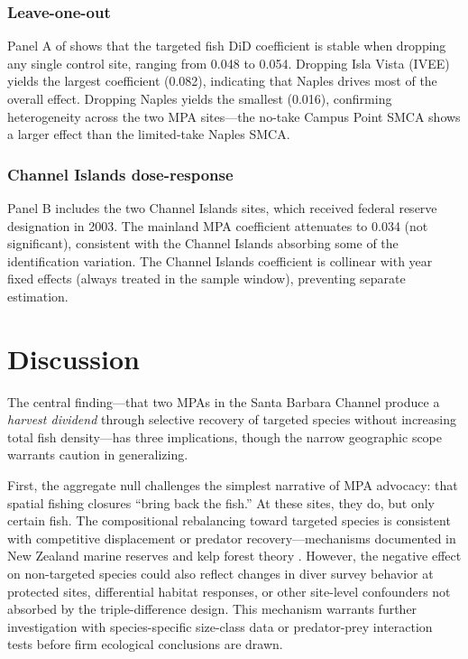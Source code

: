 \documentclass[12pt]{article}
\begin{document}


\subsubsection*{Leave-one-out} Panel A of  shows that the targeted fish DiD coefficient is stable when dropping any single control site, ranging from 0.048 to 0.054. Dropping Isla Vista (IVEE) yields the largest coefficient (0.082), indicating that Naples drives most of the overall effect. Dropping Naples yields the smallest (0.016), confirming heterogeneity across the two MPA sites---the no-take Campus Point SMCA shows a larger effect than the limited-take Naples SMCA.

\subsubsection*{Channel Islands dose-response} Panel B includes the two Channel Islands sites, which received federal reserve designation in 2003. The mainland MPA coefficient attenuates to 0.034 (not significant), consistent with the Channel Islands absorbing some of the identification variation. The Channel Islands coefficient is collinear with year fixed effects (always treated in the sample window), preventing separate estimation.


\section{Discussion}
\label{sec:discussion}

The central finding---that two MPAs in the Santa Barbara Channel produce a \textit{harvest dividend} through selective recovery of targeted species without increasing total fish density---has three implications, though the narrow geographic scope warrants caution in generalizing.

First, the aggregate null challenges the simplest narrative of MPA advocacy: that spatial fishing closures ``bring back the fish.'' At these sites, they do, but only certain fish. The compositional rebalancing toward targeted species is consistent with competitive displacement or predator recovery---mechanisms documented in New Zealand marine reserves \citep{shears2006babcock, shears2002} and kelp forest theory \citep{estes1974sea, steneck2002kelp}. However, the negative effect on non-targeted species could also reflect changes in diver survey behavior at protected sites, differential habitat responses, or other site-level confounders not absorbed by the triple-difference design. This mechanism warrants further investigation with species-specific size-class data or predator-prey interaction tests before firm ecological conclusions are drawn.
\end{document}
